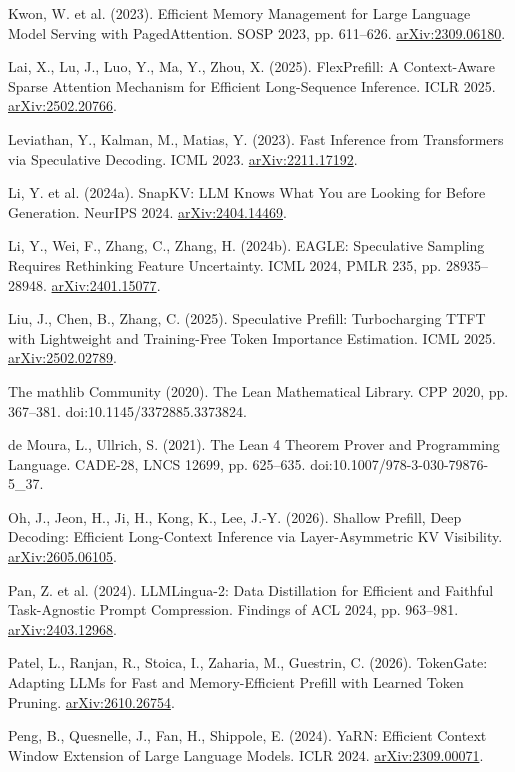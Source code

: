 \documentclass[11pt]{article}
\begin{document}
\begin{list}{}{\setlength{\leftmargin}{1.5em}\setlength{\itemindent}{-1.5em}\setlength{\itemsep}{1pt}\setlength{\parsep}{0pt}}
\item Kwon, W. et al. (2023). Efficient Memory Management for Large Language Model Serving with PagedAttention. SOSP 2023, pp. 611--626. \href{https://arxiv.org/abs/2309.06180}{arXiv:2309.06180}.
\item Lai, X., Lu, J., Luo, Y., Ma, Y., Zhou, X. (2025). FlexPrefill: A Context-Aware Sparse Attention Mechanism for Efficient Long-Sequence Inference. ICLR 2025. \href{https://arxiv.org/abs/2502.20766}{arXiv:2502.20766}.
\item Leviathan, Y., Kalman, M., Matias, Y. (2023). Fast Inference from Transformers via Speculative Decoding. ICML 2023. \href{https://arxiv.org/abs/2211.17192}{arXiv:2211.17192}.
\item Li, Y. et al. (2024a). SnapKV: LLM Knows What You are Looking for Before Generation. NeurIPS 2024. \href{https://arxiv.org/abs/2404.14469}{arXiv:2404.14469}.
\item Li, Y., Wei, F., Zhang, C., Zhang, H. (2024b). EAGLE: Speculative Sampling Requires Rethinking Feature Uncertainty. ICML 2024, PMLR 235, pp. 28935--28948. \href{https://arxiv.org/abs/2401.15077}{arXiv:2401.15077}.
\item Liu, J., Chen, B., Zhang, C. (2025). Speculative Prefill: Turbocharging TTFT with Lightweight and Training-Free Token Importance Estimation. ICML 2025. \href{https://arxiv.org/abs/2502.02789}{arXiv:2502.02789}.
\item The mathlib Community (2020). The Lean Mathematical Library. CPP 2020, pp. 367--381. doi:10.1145/3372885.3373824.
\item de Moura, L., Ullrich, S. (2021). The Lean 4 Theorem Prover and Programming Language. CADE-28, LNCS 12699, pp. 625--635. doi:10.1007/978-3-030-79876-5\_37.
\item Oh, J., Jeon, H., Ji, H., Kong, K., Lee, J.-Y. (2026). Shallow Prefill, Deep Decoding: Efficient Long-Context Inference via Layer-Asymmetric KV Visibility. \href{https://arxiv.org/abs/2605.06105}{arXiv:2605.06105}.
\item Pan, Z. et al. (2024). LLMLingua-2: Data Distillation for Efficient and Faithful Task-Agnostic Prompt Compression. Findings of ACL 2024, pp. 963--981. \href{https://arxiv.org/abs/2403.12968}{arXiv:2403.12968}.
\item Patel, L., Ranjan, R., Stoica, I., Zaharia, M., Guestrin, C. (2026). TokenGate: Adapting LLMs for Fast and Memory-Efficient Prefill with Learned Token Pruning. \href{https://arxiv.org/abs/2610.26754}{arXiv:2610.26754}.
\item Peng, B., Quesnelle, J., Fan, H., Shippole, E. (2024). YaRN: Efficient Context Window Extension of Large Language Models. ICLR 2024. \href{https://arxiv.org/abs/2309.00071}{arXiv:2309.00071}.

\end{list}
\end{document}
